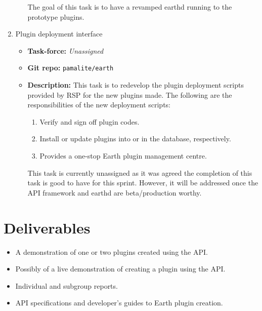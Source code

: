 \documentclass{article}
\begin{document}
\begin{enumerate}
\begin{itemize}
\begin{enumerate}
            \end{enumerate}
The goal of this task is to have a revamped earthd running to the prototype plugins.                 
      \end{itemize}
   \item Plugin deployment interface
      \begin{itemize}
         \item \textbf{Task-force:} \textit{Unassigned}
         \item \textbf{Git repo:} \texttt{pamalite/earth}
         \item \textbf{Description:} This task is to redevelop the plugin deployment scripts provided by RSP for the new plugins made. The following are the responsibilities of the new deployment scripts:
            \begin{enumerate}
               \item Verify and sign off plugin codes. 
               \item Install or update plugins into or in the database, respectively. 
               \item Provides a one-stop Earth plugin management centre. 
            \end{enumerate}
This task is currently unassigned as it was agreed the completion of this task is good to have for this sprint. However, it will be addressed once the API framework and earthd are beta/production worthy. 
      \end{itemize}
\end{enumerate}

\section*{Deliverables}

\begin{itemize}
   \item A demonstration of one or two plugins created using the API. 
   \item Possibly of a live demonstration of creating a plugin using the API.
   \item Individual and subgroup reports.
   \item API specifications and developer's guides to Earth plugin creation. 
\end{itemize}
\end{document}
